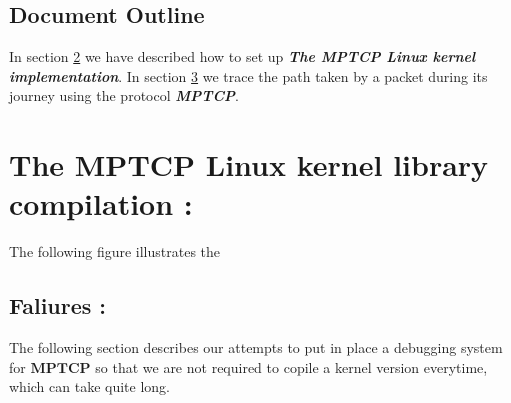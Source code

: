 \documentclass[a4paper,11pt]{article}
\begin{document}
		\vspace{0.5cm}
		\subsection{Document Outline}
			\begin{description}
				\item \hspace{2cm} In section \hyperref[sec:mptcplinuximplement]{2} we have described how to set up \textbf{\emph{The MPTCP Linux kernel implementation}}. In section \hyperref[sec:packetpath]{3} we trace the path taken by a packet during its journey using the protocol \textbf{\emph{MPTCP}}.
			\end{description}


	\clearpage
	\section{The \emph{$\mathbf{MPTCP}$} Linux kernel library compilation : }

		\label{sec:mptcplinuximplement}
		\hspace{2cm} The following figure illustrates the


		\subsection{Faliures :}

			\label{subsec:faliures}

			\hspace{2cm} The following section describes our attempts to put in place a debugging system for \emph{$\mathbf{MPTCP}$} so that we are not required to copile a kernel version everytime, which can take quite long.
			
\end{document}
